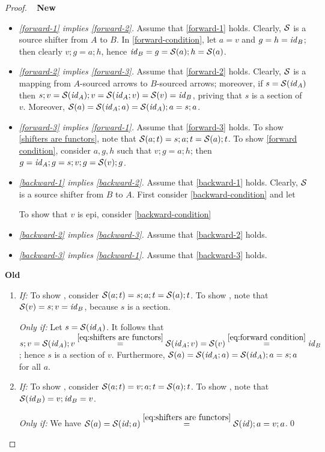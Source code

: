 \begin{proof}~
\textbf{New}
\begin{itemize}
\item \emph{\ref{forward-1} implies \ref{forward-2}.}
%
Assume that \ref{forward-1} holds. Clearly, $\mathcal{S}$ is a source shifter from $A$ to $B$. In \eqref{forward-condition}, let $a=v$ and $g=h=\mathit{id}_B$; then clearly $v;g=a;h$, hence $\mathit{id}_B=g = \mathcal{S}(a);h=\mathcal{S}(a)$.

\item \emph{\ref{forward-2} implies \ref{forward-3}.}
%
Assume that \ref{forward-2} holds. Clearly, $\mathcal{S}$ is a mapping from $A$-sourced arrows to $B$-sourced arrows; moreover, if $s=\mathcal{S}(\mathit{id}_A)$ then $s;v=\mathcal{S}(\mathit{id}_A);v=\mathcal{S}(\mathit{id}_A;v)=\mathcal{S}(v)=\mathit{id}_B$, priving that $s$ is a section of $v$. Moreover, $\mathcal{S}(a)=\mathcal{S}(\mathit{id}_A;a)=\mathcal{S}(\mathit{id}_A);a=s;a$.

\item \emph{\ref{forward-3} implies \ref{forward-1}.}
%
Assume that \ref{forward-3} holds. To show \eqref{shifters are functors}, note that $\mathcal{S}(a;t)=s;a;t=\mathcal{S}(a);t$. To show \eqref{forward condition}, consider $a,g,h$ such that $v;g=a;h$; then $g=\mathit{id}_A;g=s;v;g=\mathcal{S}(v);g$.

\end{itemize}
\item 
\begin{itemize}
\item \emph{\ref{backward-1} implies \ref{backward-2}.}
%
Assume that \ref{backward-1} holds.  Clearly, $\mathcal{S}$ is a source shifter from $B$ to $A$. First consider \eqref{backward-condition} and let 

To show that $v$ is epi, consider \eqref{backward-condition}

\item \emph{\ref{backward-2} implies \ref{backward-3}.}
%
Assume that \ref{backward-2} holds.

\item \emph{\ref{backward-3} implies \ref{backward-1}.}
%
Assume that \ref{backward-3} holds.
\end{itemize}
\textbf{Old}

\begin{enumerate}
\item \textit{If:} To show , consider $\mathcal{S}(a;t)=s;a;t=\mathcal{S}(a);t$. To show , note that $\mathcal{S}(v)=s;v=\mathit{id}_B$, because $s$ is a section.

\smallskip
\textit{Only if:} Let $s=\mathcal{S}(\mathit{id}_A)$. It follows that $s;v=\mathcal{S}(\mathit{id}_A);v\stackrel{\eqref{eq:shifters are functors}}{=}\mathcal{S}(\mathit{id}_A;v)=\mathcal{S}(v)\stackrel{\eqref{eq:forward condition}}{=}\mathit{id}_B$; hence $s$ is a section of $v$. Furthermore, $\mathcal{S}(a)=\mathcal{S}(\mathit{id}_A;a)=\mathcal{S}(\mathit{id}_A);a=s;a$ for all $a$.

\item \textit{If:} To show , consider $\mathcal{S}(a;t)=v;a;t=\mathcal{S}(a);t$. To show , note that $\mathcal{S}(\mathit{id}_B)=v;\mathit{id}_B=v$.

\smallskip
\textit{Only if:} We have $\mathcal{S}(a)=\mathcal{S}(\mathit{id};a)\stackrel{\eqref{eq:shifters are functors}}{=}\mathcal{S}(\mathit{id});a=v;a$.\qed
\end{enumerate}
\end{proof}
